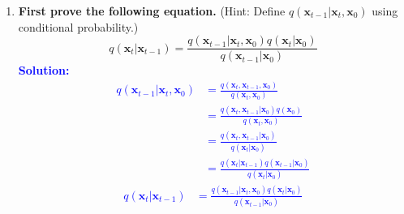 \documentclass{article}
\begin{document}
\begin{enumerate}
\begin{enumerate}
\item
\textbf{First prove the following equation.}
(Hint: Define $q(\textbf{x}_{t-1}|\textbf{x}_t, \textbf{x}_0)$ using conditional probability.)
\begin{equation}
    q(\textbf{x}_t|\textbf{x}_{t-1}) = \frac{q(\textbf{x}_{t-1}|\textbf{x}_t, \textbf{x}_0) q(\textbf{x}_t|\textbf{x}_0)}{q(\textbf{x}_{t-1}|\textbf{x}_0)}
\end{equation}
\textcolor{blue}{
    \textbf{Solution: } 
    \begin{align*}
        q(\textbf{x}_{t-1}|\textbf{x}_t, \textbf{x}_0) 
        &= \frac{q(\textbf{x}_t, \textbf{x}_{t-1}, \textbf{x}_0)}{q(\textbf{x}_t, \textbf{x}_0)} \\
        &= \frac{q(\textbf{x}_t, \textbf{x}_{t-1} | \textbf{x}_0)q(\textbf{x}_0)}{q(\textbf{x}_t, \textbf{x}_0)} \\
        &= \frac{q(\textbf{x}_t, \textbf{x}_{t-1} | \textbf{x}_0)}{q(\textbf{x}_t | \textbf{x}_0)} \\
        &= \frac{q(\textbf{x}_t|\textbf{x}_{t-1})q(\textbf{x}_{t-1}|\textbf{x}_0)}{q(\textbf{x}_t | \textbf{x}_0)}
    \end{align*}
    \begin{align*}
        q(\textbf{x}_t|\textbf{x}_{t-1}) 
        &= \frac{q(\textbf{x}_{t-1}|\textbf{x}_t, \textbf{x}_0) q(\textbf{x}_t|\textbf{x}_0)}{q(\textbf{x}_{t-1}|\textbf{x}_0)}
    \end{align*}
}


\end{enumerate}
\end{enumerate}
\end{document}
